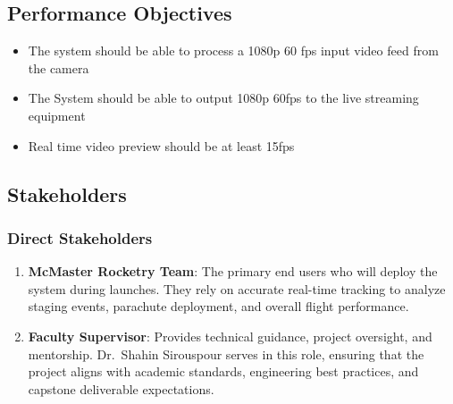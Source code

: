 \documentclass{article}
\begin{document}
\subsection{Performance Objectives}
\label{sec:performance}

\begin{itemize}
  \item The system should be able to process a 1080p 60 fps input video feed from the camera
  \item The System should be able to output 1080p 60fps to the live streaming equipment
  \item Real time video preview should be at least 15fps
\end{itemize}

\subsection{Stakeholders}

\subsubsection*{Direct Stakeholders}
\begin{enumerate}
    \item \textbf{McMaster Rocketry Team}: The primary end users who will deploy
    the system during launches. They rely on accurate real-time tracking to analyze
    staging events, parachute deployment, and overall flight performance.

    \item \textbf{Faculty Supervisor}: Provides technical guidance, project
    oversight, and mentorship. Dr.~Shahin Sirouspour serves in this role, ensuring
    that the project aligns with academic standards, engineering best practices,
    and capstone deliverable expectations.


\end{enumerate}
\end{document}

